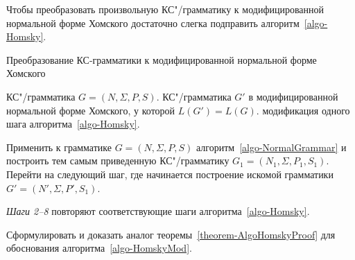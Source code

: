 Чтобы преобразовать произвольную КС"/грамматику к модифицированной нормальной форме Хомского достаточно слегка подправить алгоритм~\ref{algo-Homsky}.

\begin{AlgoEnv}[H]
\label{algo-Homsky-Mod}
\caption{Преобразование КС-грамматики к модифицированной нормальной форме Хомского}

\AlgoPre%
    {КС"/грамматика $G=(N,\Sigma,P,S)$.}
    {КС"/грамматика $G'$ в модифицированной нормальной форме Хомского, у которой $L(G')=L(G)$.}
    {модификация одного шага алгоритма~\ref{algo-Homsky}.}

\vspace{-5mm}
\varhrulefill[.2pt]

\begin{algoenum}[leftmargin=2cm]
        \item
 Применить к грамматике $G=(N,\Sigma,P,S)$ алгоритм~\ref{algo-NormalGrammar} и построить тем самым приведенную КС"/грамматику $G_1=(N_1,\Sigma,P_1,S_1)$. Перейти на следующий шаг, где начинается построение искомой грамматики $G'=(N',\Sigma,P',S_1)$.

        \item[\textit{Шаги 2--8}]
 повторяют соответствующие шаги алгоритма~\ref{algo-Homsky}.
\end{algoenum}
\end{AlgoEnv}

\begin{myproblem}
Сформулировать и доказать аналог теоремы~\ref{theorem-AlgoHomskyProof} для обоснования алгоритма~\ref{algo-HomskyMod}.
\end{myproblem}


